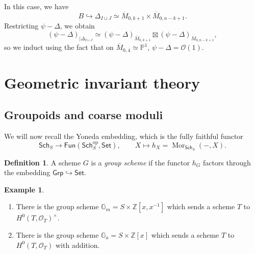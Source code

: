 \documentclass{amsart}
\theoremstyle{definition}
\newtheorem{defn}[thm]{Definition}
\newtheorem{exm}[thm]{Example}
\theoremstyle{remark}
\theoremstyle{plain}
\theoremstyle{definition}
\theoremstyle{remark}
\newcommand{\G}{\mathbb{G}}
\newcommand{\Z}{\mathbb{Z}}
\renewcommand{\P}{\mathbb{P}}
\newcommand{\mc}[1]{\mathcal{#1}}
\newcommand{\mr}[1]{\mathrm{#1}}
\newcommand{\on}[1]{\operatorname{#1}}
\newcommand{\ms}[1]{\mathsf{#1}}
\newcommand{\ol}[1]{\overline{#1}}
\newcommand{\1}{\mathbf{1}}
\newcommand{\2}{\mathbf{2}}
\newcommand{\3}{\mathbf{3}}
\begin{document}
In this case, we have
\[ B \hookrightarrow \Delta_{I \sqcup J} \simeq \ol{M}_{0, k+1} \times \ol{M}_{0, n-k+1}. \]
Restricting \(\psi - \Delta\), we obtain
\[ (\psi - \Delta)_{|\Delta_{I \sqcup J}} \simeq (\psi - \Delta)_{\ol{M}_{0, k+1}} \boxtimes (\psi -\Delta)_{\ol{M}_{0, n-k+1}}, \]
so we induct using the fact that on \(\ol{M}_{0,4} \simeq \P^1\), \(\psi - \Delta = \mc{O}(1)\).

\section{Geometric invariant theory}%
\label{sec:Geometric invariant theory}

\subsection{Groupoids and coarse moduli}%
\label{sub:Groupoids and coarse moduli}


We will now recall the Yoneda embedding, which is the  fully faithful functor
\[ \ms{Sch}_S \to \ms{Fun}(\ms{Sch}_S^{\mr{op}}, \ms{Set}), \qquad X \mapsto h_X = \on{Mor}_{\ms{Sch}_S}(-, X). \]

\begin{defn}
    A scheme \(G\) is a \textit{group scheme} if the functor \(h_G\) factors through the embedding \(\ms{Grp} \hookrightarrow \ms{Set}\).
\end{defn}

\begin{exm}\leavevmode
    \begin{enumerate}
        \item There is the group scheme \(\G_m = S \times \Z[x, x^{-1}]\) which sends a scheme \(T\) to \(H^0(T, \mc{O}_T)^{\times}\).
        \item There is the group scheme \(\G_a = S \times \Z[x]\) which sends a scheme \(T\) to \(H^0(T, \mc{O}_T)\) with addition.
    \end{enumerate}
\end{exm}
\end{document}
